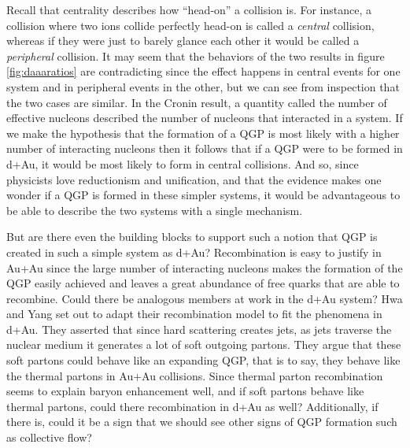 Recall that centrality describes how ``head-on'' a collision is. For instance, a collision where two ions collide perfectly head-on is called a \textit{central} collision, whereas if they were just to barely glance each other it would be called a \textit{peripheral} collision. It may seem that the behaviors of the two results in figure \ref{fig:daaaratios} are contradicting since the effect happens in central events for one system and in peripheral events in the other, but we can see from inspection that the two cases are similar. In the Cronin result, a quantity called the number of effective nucleons described the number of nucleons that interacted in a system. If we make the hypothesis that the formation of a QGP is most likely with a higher number of interacting nucleons then it follows that if a QGP were to be formed in d+Au, it would be most likely to form in central collisions. And so, since physicists love reductionism and unification, and that the evidence makes one wonder if a QGP is formed in these simpler systems, it would be advantageous to be able to describe the two systems with a single mechanism.

But are there even the building blocks to support such a notion that QGP is created in such a simple system as d+Au? Recombination is easy to justify in Au+Au since the large number of interacting nucleons makes the formation of the QGP easily achieved and leaves a great abundance of free quarks that are able to recombine. Could there be analogous members at work in the d+Au system? 
Hwa and Yang set out to adapt their recombination model to fit the phenomena in d+Au\citep{PhysRevLett.93.082302}. They asserted that since hard scattering creates jets, as jets traverse the nuclear medium it generates a lot of soft outgoing partons. They argue that these soft partons could behave like an expanding QGP, that is to say, they behave like the thermal partons in Au+Au collisions. Since thermal parton recombination seems to explain baryon enhancement well, and if soft partons behave like thermal partons, could there recombination in d+Au as well? Additionally, if there is, could it be a sign that we should see other signs of QGP formation such as collective flow? 


